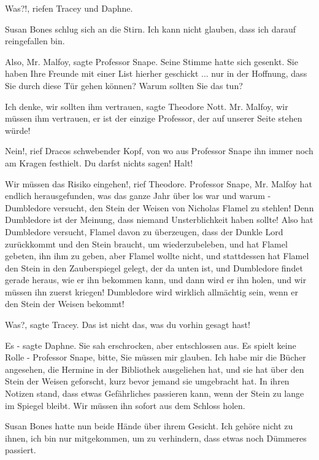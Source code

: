 \glqq{}Was?!\grqq{}, riefen Tracey und Daphne.

Susan Bones schlug sich an die Stirn. \glqq{}Ich kann nicht glauben, dass ich
darauf reingefallen bin.\grqq{}

\glqq{}Also, Mr. Malfoy\grqq{}, sagte Professor Snape. Seine Stimme hatte sich
gesenkt. \glqq{}Sie haben Ihre Freunde mit einer List hierher geschickt ... nur in
der Hoffnung, dass Sie durch diese Tür gehen können? Warum sollten Sie das tun?\grqq{}

\glqq{}Ich denke, wir sollten ihm vertrauen\grqq{}, sagte Theodore Nott. \glqq{}
Mr. Malfoy, wir müssen ihm vertrauen, er ist der einzige Professor, der auf
unserer Seite stehen würde!\grqq{}

\glqq{}Nein!\grqq{}, rief Dracos schwebender Kopf, von wo aus Professor Snape ihn
immer noch am Kragen festhielt. \glqq{}Du darfst nichts sagen! Halt!\grqq{}

\glqq{}Wir müssen das Risiko eingehen!\grqq{}, rief Theodore. \glqq{}Professor
Snape, Mr. Malfoy hat endlich herausgefunden, was das ganze Jahr über los war
und warum - Dumbledore versucht, den Stein der Weisen von Nicholas Flamel zu
stehlen! Denn Dumbledore ist der Meinung, dass niemand Unsterblichkeit haben
sollte! Also hat Dumbledore versucht, Flamel davon zu überzeugen, dass der
Dunkle Lord zurückkommt und den Stein braucht, um wiederzubeleben, und hat
Flamel gebeten, ihn ihm zu geben, aber Flamel wollte nicht, und stattdessen hat
Flamel den Stein in den Zauberspiegel gelegt, der da unten ist, und Dumbledore
findet gerade heraus, wie er ihn bekommen kann, und dann wird er ihn holen, und
wir müssen ihn zuerst kriegen! Dumbledore wird wirklich allmächtig sein, wenn er
den Stein der Weisen bekommt!\grqq{}

\glqq{}Was?\grqq{}, sagte Tracey. \glqq{}Das ist nicht das, was du vorhin gesagt
hast!\grqq{}

\glqq{}Es -\grqq{} sagte Daphne. Sie sah erschrocken, aber entschlossen aus.
\glqq{}Es spielt keine Rolle - Professor Snape, bitte, Sie müssen mir glauben.
Ich habe mir die Bücher angesehen, die Hermine in der Bibliothek ausgeliehen
hat, und sie hat über den Stein der Weisen geforscht, kurz bevor jemand sie
umgebracht hat. In ihren Notizen stand, dass etwas Gefährliches passieren kann,
wenn der Stein zu lange im Spiegel bleibt. Wir müssen ihn sofort aus dem Schloss
holen.\grqq{}

Susan Bones hatte nun beide Hände über ihrem Gesicht. \glqq{}Ich gehöre nicht zu
ihnen, ich bin nur mitgekommen, um zu verhindern, dass etwas noch Dümmeres
passiert.\grqq{}


